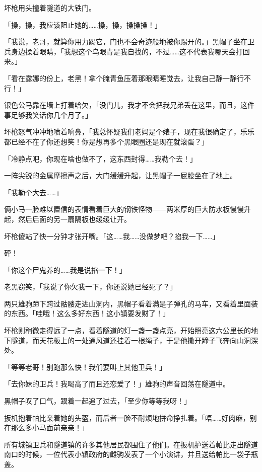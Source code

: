 
坏枪用头撞着隧道的大铁门。

「操，操，我应该阻止她的……操，操，操操操！」

「我说，老哥，就算你用力踢它，门也不会奇迹般地被你踢开的。」黑帽子坐在卫兵身边揉着眼睛，「我想这个乌眼青是我自找的，不过……这不代表我哪天会打回来。」

「看在露娜的份上，老黑！拿个腌青鱼压着那眼睛睡觉去，让我自己静一静行不行！」

银色公马靠在墙上打着哈欠，「没门儿，我才不会把我兄弟丢在这里，而且，这件事足够我笑话你几个月了。」

坏枪怒气冲冲地喷着响鼻，「我总怀疑我们老妈是个婊子，现在我很确定了，乐乐都已经不在了你还想笑！你是想再多个黑眼圈还是现在就滚蛋？」

「冷静点吧，你现在啥也做不了，这东西封得……我勒个去！」

一阵尖锐的金属摩擦声之后，大门缓缓升起，让黑帽子一屁股坐在了地上。

「我勒个大去……」

俩小马一脸难以置信的表情看着巨大的钢铁怪物——两米厚的巨大防水板慢慢升起，然后后面的另一扇隔板也缓缓让开。

坏枪傻站了快一分钟才张开嘴。「这……我……没做梦吧？掐我一下……」

砰！

「你这个尸鬼养的……我是说掐一下！」

老黑窃笑，「我说了你欠我一下，你还说她已经死了？」

两只雄驹蹄下跨过骷髅走进山洞内，黑帽子看着满是子弹孔的马车，又看着里面装的东西。「哇哦！这么多好东西！这小镇要发财了！」

坏枪则稍微走得远了一点，看着隧道的灯一盏一盏点亮，开始照亮这六公里长的地下隧道，而天花板上的一处通风道还挂着一根绳子，于是他撒开蹄子飞奔向山洞深处。

「等等老哥！别跑那么快！我们要叫上其他卫兵！」

「去你妹的卫兵！我喝高了而且还恋爱了！」雄驹的声音回荡在隧道中。

黑帽子叹了口气，跟着一起追了过去，「至少你等等我呀！」

\horizonline


扳机抱着帕比亲着她的头盔，而后者一脸不耐烦地拼命挣扎着。「唔……好肉麻，别在那么多小马面前亲亲！」

所有城镇卫兵和隧道镇的许多其他居民都围住了他们。在扳机护送着帕比走出隧道南口的时候，一位代表小镇政府的雌驹发表了一个小演讲，并且送给帕比一袋子瓶盖。

